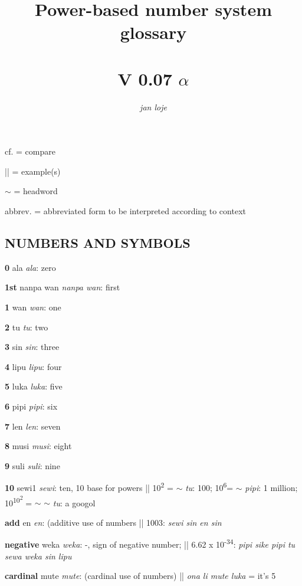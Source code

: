 \documentclass{article}
\title{Power-based number system glossary \\[1ex]{\HHUGE{\tpf lipu-nimi pi nasin nanpa sewi1}} \\ V 0.07 $\alpha$}
\author{\textit{jan loje}}
\begin{document}
\maketitle

\newcommand\tpDef[4]{\textbf{#1} {\Large\tpf #2} \textit{#3}: #4}


\newcommand\tpDefB[3]{\textbf{#1} {\Large\tpf #2}: \textit{#3}}

\setlength{\parskip}{0.3em}

cf. = compare

|| = example(s)

$\sim$ = headword

abbrev. = abbreviated form to be interpreted according to context


\begin{multicols}{2}
\raggedright
\begin{hangparas}{1cm}{1}

\section*{NUMBERS AND SYMBOLS}

\tpDef {0}{ala}{ala}{zero}

\tpDef {1st}{nanpa wan}{nanpa wan}{first}

\tpDef {1}{wan}{wan}{one}

\tpDef {2}{tu}{tu}{two}

\tpDef {3}{sin}{sin}{three}

\tpDef {4}{lipu}{lipu}{four}

\tpDef {5}{luka}{luka}{five}

\tpDef {6}{pipi}{pipi}{six}

\tpDef {7}{len}{len}{seven}

\tpDef {8}{musi}{musi}{eight}

\tpDef {9}{suli}{suli}{nine}

\tpDef {10}{sewi1}{sewi}{ten, 10 base for powers || 10\textsuperscript{2} = $\sim$ \textit{tu}: 100;  10\textsuperscript{6}= $\sim$ \textit{pipi}: 1 million; 10\textsuperscript{10\textsuperscript{2}} = $\sim$ $\sim$ \textit{tu}: a googol }

\tpDef {add}{en}{en}{(additive use of numbers || 1003:\textit{ sewi sin en sin}}

\tpDef {negative}{weka}{weka}{-, sign of negative number; ||  6.62 x 10\textsuperscript{-34}: \textit{pipi sike pipi tu sewa weka sin lipu} }

\tpDef {cardinal}{mute}{mute}{(cardinal use of numbers) || \textit{ona li mute luka} = it's 5}


\end{hangparas}
\end{multicols}
\end{document}
